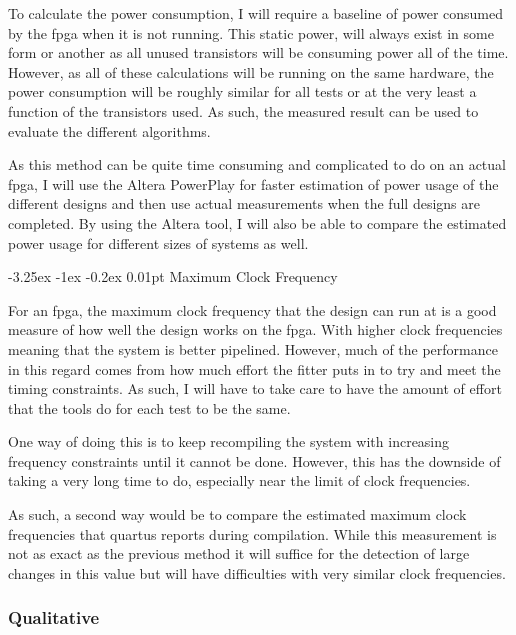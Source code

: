\documentclass[paper=a4, fontsize=11pt, bibliography=totocnumbered]{scrartcl}
\makeatletter
\renewcommand\paragraph{\@startsection{paragraph}{4}{\z@}%
  {-3.25ex \@plus -1ex \@minus -0.2ex}%
  {0.01pt}%
  {\raggedsection\normalfont\sectfont\nobreak\size@paragraph}%
}
\numberwithin{equation}{section}		%
\numberwithin{figure}{section}			%
\numberwithin{table}{section}				%
\makeatother
\begin{document}
To calculate the power consumption, I will require a baseline of power consumed by the \gls{fpga} when it is not running. This static power, will always exist in some form or another as all unused transistors will be consuming power all of the time\cite{5_gardiner_2008}. However, as all of these calculations will be running on the same hardware, the power consumption will be roughly similar for all tests or at the very least a function of the transistors used. As such, the measured result can be used to evaluate the different algorithms.

As this method can be quite time consuming and complicated to do on an actual \gls{fpga}, I will use the Altera PowerPlay\cite{man:powerplay} for faster estimation of power usage of the different designs and then use actual measurements when the full designs are completed. By using the Altera tool, I will also be able to compare the estimated power usage for different sizes of systems as well.

\paragraph{Maximum Clock Frequency}

For an \gls{fpga}, the maximum clock frequency that the design can run at is a good measure of how well the design works on the \gls{fpga}. With higher clock frequencies meaning that the system is better pipelined. However, much of the performance in this regard comes from how much effort the fitter puts in to try and meet the timing constraints. As such, I will have to take care to have the amount of effort that the tools do for each test to be the same.

One way of doing this is to keep recompiling the system with increasing frequency constraints until it cannot be done. However, this has the downside of taking a very long time to do, especially near the limit of clock frequencies.

As such, a second way would be to compare the estimated maximum clock frequencies that \gls{quartus} reports during compilation. While this measurement is not as exact as the previous method it will suffice for the detection of large changes in this value but will have difficulties with very similar clock frequencies.

\subsubsection{Qualitative}
\end{document}
